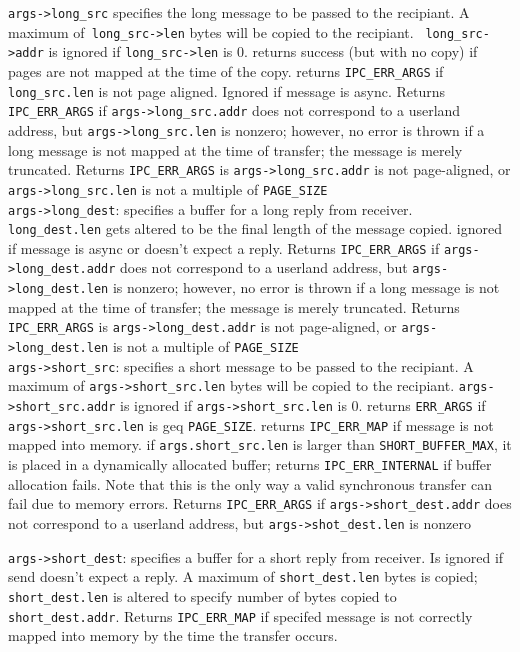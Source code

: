 \documentclass{article}
\begin{document}
  \verb|args->long_src| specifies the long message to be passed to the recipiant.  A
    maximum of\verb| long_src->len| bytes will be copied to the recipiant. \verb| long_src->addr|
    is ignored if \verb|long_src->len| is 0.  returns success (but with no copy) if pages
    are not mapped at the time of the copy.  returns \verb|IPC_ERR_ARGS| if \verb|long_src.len| is 
    not page aligned. Ignored if message is async.  Returns \verb|IPC_ERR_ARGS| if
    \verb|args->long_src.addr|  does not correspond to a userland address, but
    \verb|args->long_src.len| is nonzero; however, no error is thrown if a long
    message is not mapped at the time of transfer; the message is merely
    truncated.  Returns \verb|IPC_ERR_ARGS| is \verb|args->long_src.addr| is not
    page-aligned, or \verb|args->long_src.len| is not a multiple of \verb|PAGE_SIZE|\\

   \verb|args->long_dest|: specifies a buffer for a long reply from receiver.
   \verb| long_dest.len| gets altered to be the final length of the message copied.  ignored if
    message is async or doesn't expect a reply.  Returns \verb|IPC_ERR_ARGS| if
    \verb|args->long_dest.addr|  does not correspond to a userland address, but
    \verb|args->long_dest.len| is nonzero; however, no error is thrown if a long
 message is not mapped at the time of transfer; the message is merely
 truncated.  Returns \verb|IPC_ERR_ARGS| is \verb|args->long_dest.addr| is not
    page-aligned, or \verb|args->long_dest.len| is not a multiple of \verb|PAGE_SIZE|\\
 
  \verb|args->short_src|: specifies a short message to be passed to the recipiant.  A
    maximum of \verb|args->short_src.len| bytes will be copied to the recipiant.
 \verb|args->short_src.addr| is ignored if \verb|args->short_src.len| is 0.  returns \verb|ERR_ARGS| if
 \verb|args->short_src.len| is geq \verb|PAGE_SIZE|. returns \verb|IPC_ERR_MAP| if
 message is not mapped into memory.  if \verb|args.short_src.len| is larger
 than \verb|SHORT_BUFFER_MAX|, it is placed in a dynamically allocated buffer;
 returns \verb|IPC_ERR_INTERNAL| if buffer allocation fails.  Note
  that this is the only way a valid synchronous transfer can fail due to
 memory errors. Returns \verb|IPC_ERR_ARGS| if \verb|args->short_dest.addr|  
 does not correspond to a userland address, but \verb|args->shot_dest.len| is nonzero
 
  \verb|args->short_dest|: specifies a buffer for a short reply from receiver.  Is ignored
 if send doesn't expect a reply.  A maximum of \verb|short_dest.len| bytes is copied;
 \verb|short_dest.len| is altered to specify number of bytes copied to
 \verb|short_dest.addr|.  Returns \verb|IPC_ERR_MAP| if specifed message is not correctly mapped  into memory by the time the transfer occurs. \\
\end{document}
